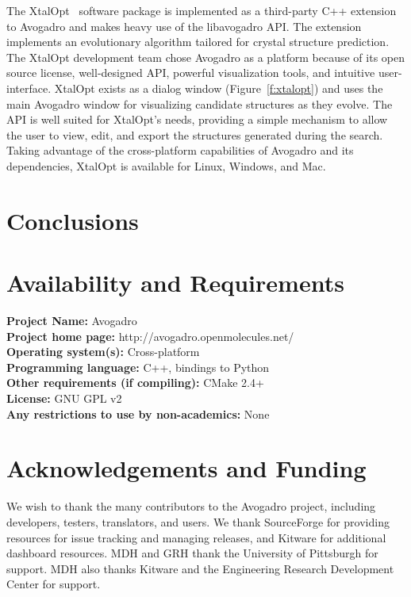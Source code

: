 \documentclass[10pt]{bmc_article}
\newenvironment{bmcformat}{\begin{raggedright}
\baselineskip20pt\sloppy\setboolean{publ}{false}}{\end{raggedright}
\baselineskip20pt\sloppy}
\begin{document}
\begin{bmcformat}
The XtalOpt~\cite{xo1, xo2} software package is implemented as a third-party C++
extension to Avogadro and makes heavy use of the libavogadro API. The extension
implements an evolutionary algorithm tailored for crystal structure prediction.
The XtalOpt development team chose Avogadro as a platform because of its
open source license, well-designed API, powerful visualization tools, and
intuitive user-interface. XtalOpt exists as a dialog window
(Figure~\ref{f:xtalopt}) and uses the main Avogadro window for visualizing
candidate structures as they evolve. The API is well suited for XtalOpt’s needs,
providing a simple mechanism to allow the user to view, edit, and export the
structures generated during the search. Taking advantage of the cross-platform
capabilities of Avogadro and its dependencies, XtalOpt is available for Linux,
Windows, and Mac.

\section{Conclusions}

\section{Availability and Requirements}

\textbf{Project Name:} Avogadro \\
\textbf{Project home page:} http://avogadro.openmolecules.net/ \\
\textbf{Operating system(s):} Cross-platform \\
\textbf{Programming language:} C++, bindings to Python \\
\textbf{Other requirements (if compiling):} CMake 2.4+ \\
\textbf{License:} GNU GPL v2 \\
\textbf{Any restrictions to use by non-academics:} None

\section{Acknowledgements and Funding}

We wish to thank the many contributors to the Avogadro project, including
developers, testers, translators, and users. We thank SourceForge for
providing resources for issue tracking and managing releases, and
Kitware for additional dashboard resources. MDH and GRH thank the
University of Pittsburgh for support. MDH also thanks Kitware and the
Engineering Research Development Center for support.


\end{bmcformat}
\end{document}
